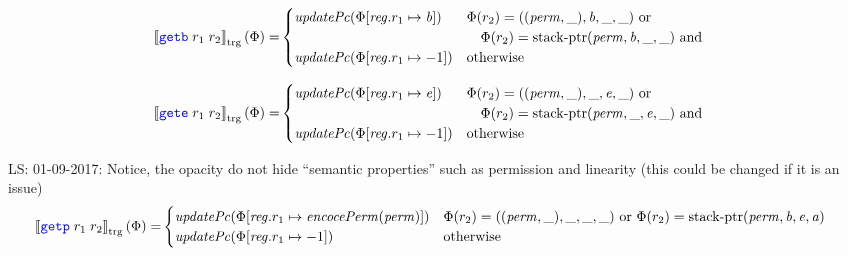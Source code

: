 \documentclass[a4paper]{article}
\newcommand\lau[1]{{\color{purple} \sf \footnotesize {LS: #1}}\\}
\newcommand{\sem}[1]{\left\llbracket #1 \right\rrbracket}
\newcommand{\tsem}[2][\Phi]{\sem{#2}_{\mathrm{trg}}(#1)}
\newcommand{\tand}{\text{ and }}
\newcommand{\totherwise}{\text{otherwise }}
\newcommand{\sourcecolor}[1]{\color{blue}}
\newcommand{\src}[1]{{\sourcecolor{} #1}}
\newcommand{\zinstr}[1]{\texttt{#1}}
\newcommand{\twoinstr}[3]{
  \ifthenelse{\equal{#2#3}{}}
  {\zinstr{#1}}
  {\zinstr{#1} \; #2 \; #3}
}
\newcommand{\sgetb}[2]{\twoinstr{\src{getb}}{#1}{#2}}
\newcommand{\sgete}[2]{\twoinstr{\src{gete}}{#1}{#2}}
\newcommand{\sgetp}[2]{\twoinstr{\src{getp}}{#1}{#2}}
\newcommand{\update}[2]{[#1 \mapsto #2]}
\newcommand{\updReg}[2]{\update{\reg.#1}{#2}}
\newcommand{\perm}{\var{perm}}
\newcommand{\stkptr}[1]{\mathrm{stack\text{-}ptr}(#1)}
\newcommand{\var}[1]{\mathit{#1}}
\newcommand{\reg}{\var{reg}}
\newcommand{\baddr}{\var{b}}
\newcommand{\eaddr}{\var{e}}
\newcommand{\aaddr}{\var{a}}
\newcommand{\plainfun}[2]{
  \ifthenelse{\equal{#2}{}}
  {\mathit{#1}}
  {\mathit{#1}(#2)}
}
\newcommand{\encPerm}[1]{\plainfun{encocePerm}{#1}}
\newcommand{\updPcAddr}[1]{\plainfun{updatePc}{#1}}
\begin{document}
\begin{align*}
  \tsem{\sgetb{r_1}{r_2}} = &
                              \begin{cases}
                                \updPcAddr{\Phi\update{\reg.r_1}{\baddr}} & 
                                \arraycolsep=0pt
                                \begin{array}[t]{l}
                                  \Phi(r_2) = ((\perm,\_),\baddr,\_,\_) \text{ or } \\
                                  \quad \Phi(r_2) = \stkptr{\perm,\baddr,\_,\_} \tand\\
                                \end{array} \\
                                \updPcAddr{\Phi\updReg{r_1}{-1}} & \totherwise
                              \end{cases}
\end{align*}

\begin{align*}
  \tsem{\sgete{r_1}{r_2}} = &
                              \begin{cases}
                                \updPcAddr{\Phi\update{\reg.r_1}{\eaddr}} & 
                                \arraycolsep=0pt
                                \begin{array}[t]{l}
                                  \Phi(r_2) = ((\perm,\_),\_,\eaddr,\_) \text{ or } \\
                                  \quad \Phi(r_2) = \stkptr{\perm,\_,\eaddr,\_} \tand\\
                                \end{array} \\
                                \updPcAddr{\Phi\updReg{r_1}{-1}} & \totherwise
                              \end{cases}
\end{align*}

\lau{01-09-2017: Notice, the opacity do not hide ``semantic properties'' such as permission and linearity (this could be changed if it is an issue)}

\begin{align*}
  \tsem{\sgetp{r_1}{r_2}} = & 
                              \begin{cases}
                                \updPcAddr{}(\Phi\update{\reg.r_1}{\encPerm{\perm}}) & \Phi(r_2) = ((\perm,\_),\_,\_,\_) \text{ or } \Phi(r_2) = \stkptr{\perm,\baddr,\eaddr,\aaddr}\\
                                \updPcAddr{\Phi\updReg{r_1}{-1}} & \totherwise
                              \end{cases}
\end{align*}
\end{document}
